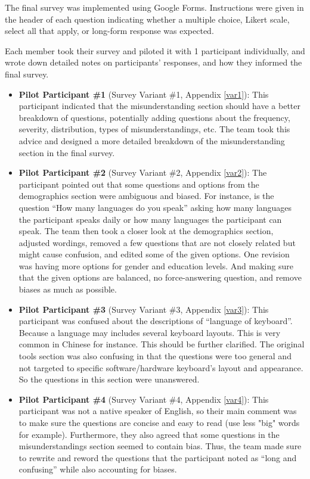 \documentclass[acmsmall,screen,authorversion,nonacm]{acmart}
\begin{document}
The final survey was implemented using Google Forms. Instructions were given in the header of each question indicating whether a multiple choice, Likert scale, select all that apply, or long-form response was expected.

Each member took their survey and piloted it with 1 participant individually, and wrote down detailed notes on participants' responses, and how they informed the final survey. 

\begin{itemize}
    \item \textbf{Pilot Participant \#1} (Survey Variant \#1, Appendix \ref{var1}): This participant indicated that the misunderstanding section should have a better breakdown of questions, potentially adding questions about the frequency, severity, distribution, types of misunderstandings, etc. The team took this advice and designed a more detailed breakdown of the misunderstanding section in the final survey. 
    \item \textbf{Pilot Participant \#2} (Survey Variant \#2, Appendix \ref{var2}): The participant pointed out that some questions and options from the demographics section were ambiguous and biased. For instance, is the question ``How many languages do you speak'' asking how many languages the participant speaks daily or how many languages the participant can speak. The team then took a closer look at the demographics section, adjusted wordings, removed a few questions that are not closely related but might cause confusion, and edited some of the given options. One revision was having more options for gender and education levels. And making sure that the given options are balanced, no force-answering question, and remove biases as much as possible. 
    \item \textbf{Pilot Participant \#3} (Survey Variant \#3, Appendix \ref{var3}): This participant was confused about the descriptions of ``language of keyboard''. Because a language may includes several keyboard layouts. This is very common in Chinese for instance. This should be further clarified. The original tools section was also confusing in that the questions were too general and not targeted to specific software/hardware keyboard's layout and appearance. So the questions in this section were unanswered. %
    \item \textbf{Pilot Participant \#4} (Survey Variant \#4, Appendix \ref{var4}): This participant was not a native speaker of English, so their main comment was to make sure the questions are concise and easy to read (use less "big" words for example). Furthermore, they also agreed that some questions in the misunderstandings section seemed to contain bias. Thus, the team made sure to rewrite and reword the questions that the participant noted as ``long and confusing'' while also accounting for biases. %

\end{itemize}
\end{document}
